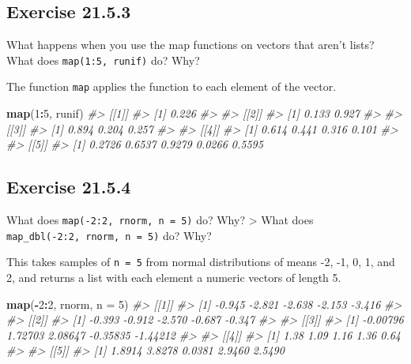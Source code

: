 \documentclass[]{book}
\newenvironment{Shaded}{\begin{snugshade}}{\end{snugshade}}
\newcommand{\CommentTok}[1]{\textcolor[rgb]{0.56,0.35,0.01}{\textit{#1}}}
\newcommand{\DataTypeTok}[1]{\textcolor[rgb]{0.13,0.29,0.53}{#1}}
\newcommand{\DecValTok}[1]{\textcolor[rgb]{0.00,0.00,0.81}{#1}}
\newcommand{\KeywordTok}[1]{\textcolor[rgb]{0.13,0.29,0.53}{\textbf{#1}}}
\newcommand{\NormalTok}[1]{#1}
\newcommand{\OperatorTok}[1]{\textcolor[rgb]{0.81,0.36,0.00}{\textbf{#1}}}
\theoremstyle{plain}
\theoremstyle{remark}
\begin{document}
\hypertarget{exercise-21.5.3}{%
\subsection*{\texorpdfstring{Exercise
{21.5.3}}{Exercise 21.5.3}}\label{exercise-21.5.3}}

What happens when you use the map functions on vectors that aren't
lists? What does \texttt{map(1:5,\ runif)} do? Why?

The function \texttt{map} applies the function to each element of the
vector.

\begin{Shaded}
\begin{Highlighting}[]
\KeywordTok{map}\NormalTok{(}\DecValTok{1}\OperatorTok{:}\DecValTok{5}\NormalTok{, runif)}
\CommentTok{#> [[1]]}
\CommentTok{#> [1] 0.226}
\CommentTok{#> }
\CommentTok{#> [[2]]}
\CommentTok{#> [1] 0.133 0.927}
\CommentTok{#> }
\CommentTok{#> [[3]]}
\CommentTok{#> [1] 0.894 0.204 0.257}
\CommentTok{#> }
\CommentTok{#> [[4]]}
\CommentTok{#> [1] 0.614 0.441 0.316 0.101}
\CommentTok{#> }
\CommentTok{#> [[5]]}
\CommentTok{#> [1] 0.2726 0.6537 0.9279 0.0266 0.5595}
\end{Highlighting}
\end{Shaded}

\hypertarget{exercise-21.5.4}{%
\subsection*{\texorpdfstring{Exercise
{21.5.4}}{Exercise 21.5.4}}\label{exercise-21.5.4}}

What does \texttt{map(-2:2,\ rnorm,\ n\ =\ 5)} do? Why? \textgreater{}
What does \texttt{map\_dbl(-2:2,\ rnorm,\ n\ =\ 5)} do? Why?

This takes samples of \texttt{n\ =\ 5} from normal distributions of
means -2, -1, 0, 1, and 2, and returns a list with each element a
numeric vectors of length 5.

\begin{Shaded}
\begin{Highlighting}[]
\KeywordTok{map}\NormalTok{(}\OperatorTok{-}\DecValTok{2}\OperatorTok{:}\DecValTok{2}\NormalTok{, rnorm, }\DataTypeTok{n =} \DecValTok{5}\NormalTok{)}
\CommentTok{#> [[1]]}
\CommentTok{#> [1] -0.945 -2.821 -2.638 -2.153 -3.416}
\CommentTok{#> }
\CommentTok{#> [[2]]}
\CommentTok{#> [1] -0.393 -0.912 -2.570 -0.687 -0.347}
\CommentTok{#> }
\CommentTok{#> [[3]]}
\CommentTok{#> [1] -0.00796  1.72703  2.08647 -0.35835 -1.44212}
\CommentTok{#> }
\CommentTok{#> [[4]]}
\CommentTok{#> [1] 1.38 1.09 1.16 1.36 0.64}
\CommentTok{#> }
\CommentTok{#> [[5]]}
\CommentTok{#> [1] 1.8914 3.8278 0.0381 2.9460 2.5490}
\end{Highlighting}
\end{Shaded}
\end{document}
